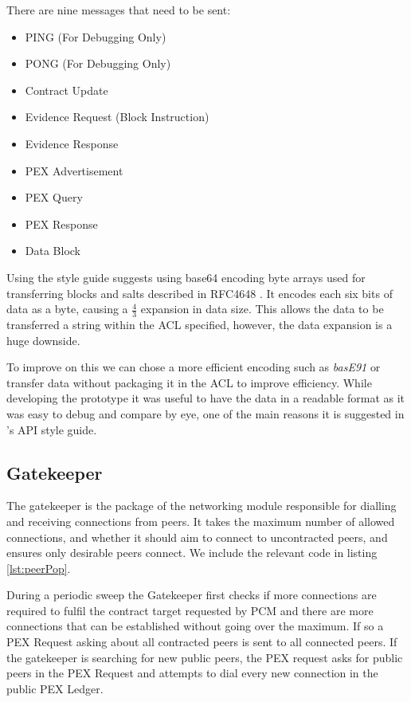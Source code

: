 \documentclass[11pt, a4paper, twoside]{report}
\begin{document}
There are nine messages that need to be sent:

\begin{itemize}
 \item PING (For Debugging Only)
 \item PONG (For Debugging Only)
 \item Contract Update
 \item Evidence Request (Block Instruction)
 \item Evidence Response
 \item PEX Advertisement
 \item PEX Query
 \item PEX Response
 \item Data Block
\end{itemize}

Using the style guide suggests using base64 encoding byte arrays used for transferring blocks and salts described in RFC4648 \citep{josefsson2006base16}. It encodes each six bits of data as a byte, causing a $\frac{4}{3}$ expansion in data size. This allows the data to be transferred a string within the ACL specified, however, the data expansion is a huge downside.

To improve on this we can chose a more efficient encoding such as \emph{basE91} \citep{joachim2015base91} or transfer data without packaging it in the ACL to improve efficiency. While developing the prototype it was useful to have the data in a readable format as it was easy to debug and compare by eye, one of the main reasons it is suggested in \cite{google2017api}'s API style guide.

\subsection{Gatekeeper}

The gatekeeper is the package of the networking module responsible for dialling and receiving connections from peers. It takes the maximum number of allowed connections, and whether it should aim to connect to uncontracted peers, and ensures only desirable peers connect. We include the relevant code in listing \ref{lst:peerPop}.

During a periodic sweep the Gatekeeper first checks if more connections are required to fulfil the contract target requested by PCM and there are more connections that can be established without going over the maximum. If so a PEX Request asking about all contracted peers is sent to all connected peers. If the gatekeeper is searching for new public peers, the PEX request asks for public peers in the PEX Request and attempts to dial every new connection in the public PEX Ledger.
\end{document}
